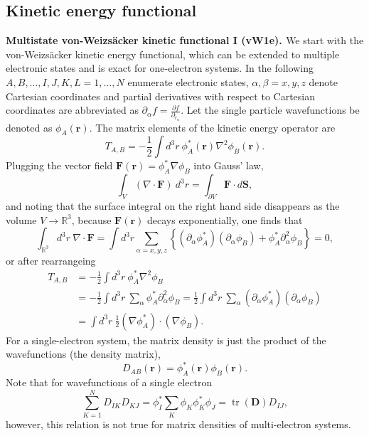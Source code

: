 \documentclass[journal=jacsat,manuscript=article]{achemso}
\DeclareMathOperator{\tr}{tr}
\newcommand\m[1]{\mathbf{#1}}
\renewcommand\vec[1]{\mathbf{#1}}
\begin{document}
\subsection{Kinetic energy functional}
\textbf{Multistate von-Weizs\"{a}cker kinetic functional I (vW1e). \label{sec:vW1e}} We start with the von-Weizs\"{a}cker kinetic energy functional, which can be extended to multiple electronic states and is exact for one-electron systems.
In the following $A,B,\ldots,I,J,K,L = 1,\ldots,N$ enumerate electronic states, $\alpha,\beta=x,y,z$ denote Cartesian coordinates and partial derivatives with respect to Cartesian coordinates are abbreviated as $\partial_{\alpha} f = \frac{\partial f}{\partial_{r_\alpha}}$. 
Let the single particle wavefunctions be denoted as $\phi_A(\vec{r})$. The matrix elements of the kinetic energy operator are
\begin{equation}
T_{A,B} = -\frac{1}{2} \int d^3\!r ~ \phi^*_A(\vec{r}) \nabla^2 \phi_B(\vec{r}).
\end{equation}
Plugging the vector field $\vec{F}(\vec{r}) = \phi^*_A \nabla \phi_B$ into Gauss' law,
\begin{equation}
 \int_V (\nabla \cdot \vec{F}) ~ d^3\!r = \int_{\partial V} \vec{F} \cdot d\vec{S},
\end{equation}
and noting that the surface integral on the right hand side disappears as the volume $V \to \mathbb{R}^3$, because $\vec{F}(\vec{r})$ decays exponentially,
one finds that
\begin{equation}
 \int_{\mathbb{R}^3} d^3\!r ~ \nabla \cdot \vec{F} = \int d^3\!r \sum_{\alpha=x,y,z} \left\{ (\partial_{\alpha} \phi^*_A)(\partial_{\alpha} \phi_B) + \phi^*_A \partial^2_{\alpha} \phi_B  \right\} = 0,
\end{equation}
or after rearrangeing
\begin{equation}
  \begin{split}
    T_{A,B} &= -\frac{1}{2} \int d^3\!r ~ \phi^*_A \nabla^2 \phi_B \\
    &= -\frac{1}{2} \int d^3\!r ~ \sum_{\alpha} \phi^*_A \partial^2_{\alpha} \phi_B = \frac{1}{2} \int d^3\!r ~ \sum_{\alpha} (\partial_{\alpha} \phi^*_A)(\partial_{\alpha} \phi_B) \\
    &= \int d^3\!r ~ \frac{1}{2} (\nabla \phi^*_A)\cdot (\nabla \phi_B) \label{eqn:kinetic_energy_1e}.
  \end{split}
\end{equation}
For a single-electron system, the matrix density is just the product of the wavefunctions (the density matrix),
\begin{equation}
 D_{AB}(\vec{r}) = \phi^*_A(\vec{r}) \phi_B(\vec{r}).
\end{equation}
Note that for wavefunctions of a single electron
\begin{equation}
 \sum_{K=1}^{N} D_{IK} D_{KJ} = \phi^*_I \sum_{K} \phi_{K} \phi^*_{K} \phi_J = \tr(\m{D}) D_{IJ},
\end{equation}
however, this relation is not true for matrix densities of multi-electron systems.
\end{document}
